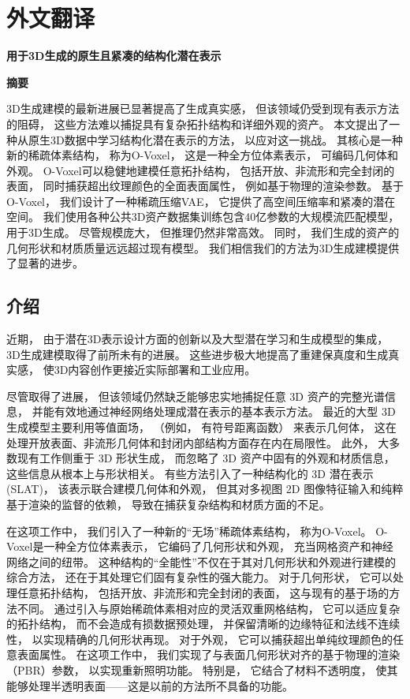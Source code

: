 \cleardoublepage

\newrefsection

\chapter{外文翻译}

\begin{center}
\large\textbf{用于3D生成的原生且紧凑的结构化潜在表示}
\end{center}

\begin{center}
\large\textbf{摘要}
\end{center}


3D生成建模的最新进展已显著提高了生成真实感，
但该领域仍受到现有表示方法的阻碍，
这些方法难以捕捉具有复杂拓扑结构和详细外观的资产。
本文提出了一种从原生3D数据中学习结构化潜在表示的方法，
以应对这一挑战。
其核心是一种新的稀疏体素结构，
称为O-Voxel，
这是一种全方位体素表示，
可编码几何体和外观。
O-Voxel可以稳健地建模任意拓扑结构，
包括开放、非流形和完全封闭的表面，
同时捕获超出纹理颜色的全面表面属性，
例如基于物理的渲染参数。
基于O-Voxel，
我们设计了一种稀疏压缩VAE，
它提供了高空间压缩率和紧凑的潜在空间。
我们使用各种公共3D资产数据集训练包含40亿参数的大规模流匹配模型，
用于3D生成。
尽管规模庞大，
但推理仍然非常高效。
同时，
我们生成的资产的几何形状和材质质量远远超过现有模型。
我们相信我们的方法为3D生成建模提供了显著的进步。

\section{介绍}
近期，
由于潜在3D表示设计方面的创新以及大型潜在学习和生成模型的集成，
3D生成建模取得了前所未有的进展。
这些进步极大地提高了重建保真度和生成真实感，
使3D内容创作更接近实际部署和工业应用。

尽管取得了进展，
但该领域仍然缺乏能够忠实地捕捉任意 3D 资产的完整光谱信息，
并能有效地通过神经网络处理成潜在表示的基本表示方法。
最近的大型 3D 生成模型主要利用等值面场，
（例如，
有符号距离函数）
来表示几何体，
这在处理开放表面、非流形几何体和封闭内部结构方面存在内在局限性。
此外，
大多数现有工作侧重于 3D 形状生成，
而忽略了 3D 资产中固有的外观和材质信息，
这些信息从根本上与形状相关。
有些方法引入了一种结构化的 3D 潜在表示 (SLAT)，
该表示联合建模几何体和外观，
但其对多视图 2D 图像特征输入和纯粹基于渲染的监督的依赖，
导致在捕获复杂结构和材质方面的不足。

在这项工作中，
我们引入了一种新的“无场”稀疏体素结构，
称为O-Voxel。
O-Voxel是一种全方位体素表示，
它编码了几何形状和外观，
充当网格资产和神经网络之间的纽带。
这种结构的“全能性”不仅在于其对几何形状和外观进行建模的综合方法，
还在于其处理它们固有复杂性的强大能力。
对于几何形状，
它可以处理任意拓扑结构，
包括开放、非流形和完全封闭的表面，
这与现有的基于场的方法不同。
通过引入与原始稀疏体素相对应的灵活双重网格结构，
它可以适应复杂的拓扑结构，
而不会造成有损数据预处理，
并保留清晰的边缘特征和法线不连续性，
以实现精确的几何形状再现。
对于外观，
它可以捕获超出单纯纹理颜色的任意表面属性。
在这项工作中，
我们实现了与表面几何形状对齐的基于物理的渲染（PBR）参数，
以实现重新照明功能。
特别是，
它结合了材料不透明度，
使其能够处理半透明表面——这是以前的方法所不具备的功能。

